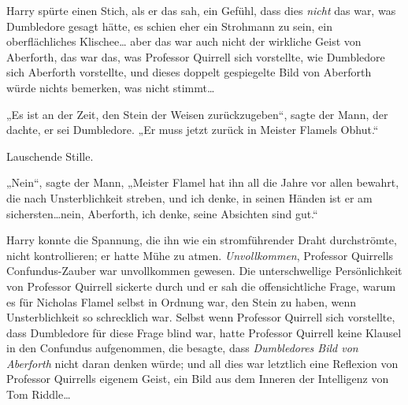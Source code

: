 Harry spürte einen Stich, als er das sah, ein Gefühl, dass dies \emph{nicht} das war, was Dumbledore gesagt hätte, es schien eher ein Strohmann zu sein, ein oberflächliches Klischee… aber das war auch nicht der wirkliche Geist von Aberforth, das war das, was Professor Quirrell sich vorstellte, wie Dumbledore sich Aberforth vorstellte, und dieses doppelt gespiegelte Bild von Aberforth würde nichts bemerken, was nicht stimmt…

„Es ist an der Zeit, den Stein der Weisen zurückzugeben“, sagte der Mann, der dachte, er sei Dumbledore. „Er muss jetzt zurück in Meister Flamels Obhut.“

Lauschende Stille.

„Nein“, sagte der Mann, „Meister Flamel hat ihn all die Jahre vor allen bewahrt, die nach Unsterblichkeit streben, und ich denke, in seinen Händen ist er am sichersten…nein, Aberforth, ich denke, seine Absichten sind gut.“

Harry konnte die Spannung, die ihn wie ein stromführender Draht durchströmte, nicht kontrollieren; er hatte Mühe zu atmen. \emph{Unvollkommen}, Professor Quirrells Confundus-Zauber war unvollkommen gewesen. Die unterschwellige Persönlichkeit von Professor Quirrell sickerte durch und er sah die offensichtliche Frage, warum es für Nicholas Flamel selbst in Ordnung war, den Stein zu haben, wenn Unsterblichkeit so schrecklich war. Selbst wenn Professor Quirrell sich vorstellte, dass Dumbledore für diese Frage blind war, hatte Professor Quirrell keine Klausel in den Confundus aufgenommen, die besagte, dass \emph{Dumbledores Bild von Aberforth} nicht daran denken würde; und all dies war letztlich eine Reflexion von Professor Quirrells eigenem Geist, ein Bild aus dem Inneren der Intelligenz von Tom Riddle…


